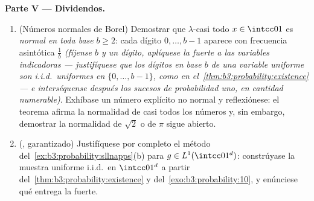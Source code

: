 \begin{problem}
\medskip
\noindent\textbf{Parte V --- Dividendos.}
\begin{enumerate}[resume]
  \item (Números normales de Borel) Demostrar que $\lambda$-casi todo
  $x \in \intcc01$ es \emph{normal en toda base} $b \geq 2$: cada dígito
  $0, \dots, b-1$ aparece con frecuencia asintótica $\frac1b$
  \emph{(fíjense $b$ y un dígito, aplíquese la
   fuerte a las variables
  indicadoras --- justifíquese que los dígitos en base $b$ de una
  variable uniforme son i.i.d.\ uniformes en $\{0,\dots,b-1\}$, como en
  el~\cref{thm:b3:probability:existence} --- e interséquense después los
  sucesos de probabilidad uno, en cantidad numerable)}. Exhíbase un
  número explícito no normal y reflexiónese: el teorema afirma la
  normalidad de casi todos los números y, sin embargo, demostrar la
  normalidad de $\sqrt2$ o de $\pi$ sigue abierto. \item
  (, garantizado)
  Justifíquese por completo el método
  del~\cref{ex:b3:probability:sllnapps}(b) para $g \in L^1(\intcc01^d)$:
  constrúyase la muestra uniforme i.i.d.\ en $\intcc01^d$ a partir
  del~\cref{thm:b3:probability:existence} y
  del~\cref{exo:b3:probability:10}, y enúnciese qué entrega la
   fuerte.
\end{enumerate}


\end{problem}
